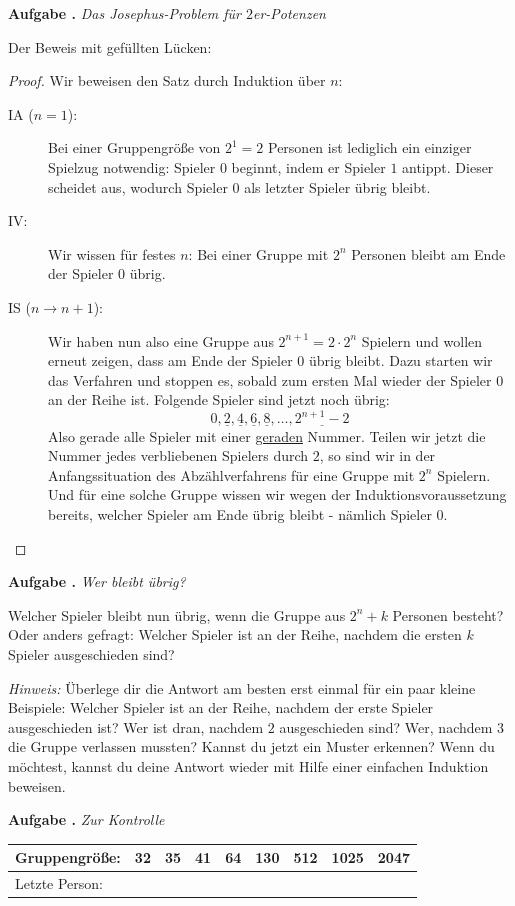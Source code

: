 \documentclass[a4paper,ngerman,12pt]{scrartcl}
\theoremstyle{definition}
\theoremstyle{plain}
\theoremstyle{remark}
\newlength{\aufgabenskip}
\newcounter{aufgabennummer}
\newenvironment{aufgabe}[1]{
	\addtocounter{aufgabennummer}{1}
	\textbf{Aufgabe \theaufgabennummer.} \emph{#1} \par
}{\vspace{\aufgabenskip}}
\begin{document}
\begin{aufgabe}{Das Josephus-Problem für $2$er-Potenzen}
Der Beweis mit gefüllten Lücken:
\begin{proof}
	Wir beweisen den Satz durch Induktion über $n$:
	\begin{description}
		\item[IA ($n=1$):] Bei einer Gruppengröße von $2^1=2$ Personen ist lediglich ein einziger Spielzug notwendig: Spieler $0$ beginnt, indem er Spieler $1$ antippt. Dieser scheidet aus, wodurch Spieler $0$ als letzter Spieler übrig bleibt.
		\item[IV:] Wir wissen für festes $n$: Bei einer Gruppe mit $2^n$ Personen bleibt am Ende der Spieler $0$ übrig.
		\item[IS ($n\to n+1$):] Wir haben nun also eine Gruppe aus $2^{n+1} = 2\cdot 2^n$ Spielern und wollen erneut zeigen, dass am Ende der Spieler $0$ übrig bleibt. Dazu starten wir das Verfahren und stoppen es, sobald zum ersten Mal wieder der Spieler $0$ an der Reihe ist. Folgende Spieler sind jetzt noch übrig:
		\[0, \underline{2}, \underline{4}, \underline{6}, \underline{8}, \dots , \underline{2^{n+1}-2}\]
		Also gerade alle Spieler mit einer \underline{geraden} Nummer. Teilen wir jetzt die Nummer jedes verbliebenen Spielers durch $2$, so sind wir in der Anfangssituation des Abzählverfahrens für eine Gruppe mit \underline{$2^n$} Spielern. Und für eine solche Gruppe wissen wir wegen der Induktionsvoraussetzung bereits, welcher Spieler am Ende übrig bleibt - nämlich Spieler \underline{$0$}. \qedhere
	\end{description}
\end{proof}
\end{aufgabe}

\begin{aufgabe}{Wer bleibt übrig?}
	Welcher Spieler bleibt nun übrig, wenn die Gruppe aus $2^n + k$ Personen besteht? Oder anders gefragt: Welcher Spieler ist an der Reihe, nachdem die ersten $k$ Spieler ausgeschieden sind?
	
	\emph{Hinweis:} Überlege dir die Antwort am besten erst einmal für ein paar kleine Beispiele: Welcher Spieler ist an der Reihe, nachdem der erste Spieler ausgeschieden ist? Wer ist dran, nachdem $2$ ausgeschieden sind? Wer, nachdem $3$ die Gruppe verlassen mussten? Kannst du jetzt ein Muster erkennen? Wenn du möchtest, kannst du deine Antwort wieder mit Hilfe einer einfachen Induktion beweisen.
\end{aufgabe}

\begin{aufgabe}{Zur Kontrolle}
	\begin{center}
		\renewcommand{\arraystretch}{2}\setlength{\tabcolsep}{1em}
		\begin{tabular}{l||c|c|c|c|c|c|c|c}
			Gruppengröße:	& 32 & 35 & 41 & 64 & 130 & 512 & 1025 & 2047 \\\hline
			Letzte Person:	&   &   &   &   &   &   &    &    
		\end{tabular}
	\end{center}	
\end{aufgabe}
\end{document}
